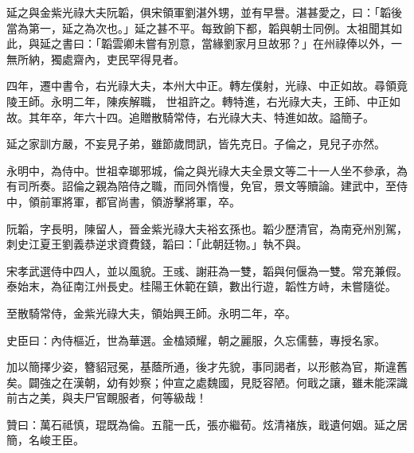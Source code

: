\begin{pinyinscope}
 延之與金紫光祿大夫阮韜，俱宋領軍劉湛外甥，並有早譽。湛甚愛之，曰：「韜後當為第一，延之為次也。」延之甚不平。每致餉下都，韜與朝士同例。太祖聞其如此，與延之書曰：「韜雲卿未嘗有別意，當緣劉家月旦故邪？」在州祿俸以外，一無所納，獨處齋內，吏民罕得見者。



 四年，遷中書令，右光祿大夫，本州大中正。轉左僕射，光祿、中正如故。尋領竟陵王師。永明二年，陳疾解職，
 世祖許之。轉特進，右光祿大夫，王師、中正如故。其年卒，年六十四。追贈散騎常侍，右光祿大夫、特進如故。謚簡子。



 延之家訓方嚴，不妄見子弟，雖節歲問訊，皆先克日。子倫之，見兒子亦然。



 永明中，為侍中。世祖幸瑯邪城，倫之與光祿大夫全景文等二十一人坐不參承，為有司所奏。詔倫之親為陪侍之職，而同外惰慢，免官，景文等贖論。建武中，至侍中，領前軍將軍，都官尚書，領游擊將軍，卒。



 阮韜，字長明，陳留人，晉金紫光祿大夫裕玄孫也。韜少歷清官，為南兗州別駕，刺史江夏王劉義恭逆求資費錢，韜曰：「此朝廷物。」執不與。



 宋孝武選侍中四人，並以風貌。王彧、謝莊為一雙，韜與何偃為一雙。常充兼假。泰始末，為征南江州長史。桂陽王休範在鎮，數出行遊，韜性方峙，未嘗隨從。



 至散騎常侍，金紫光祿大夫，領始興王師。永明二年，卒。



 史臣曰：內侍樞近，世為華選。金榼熲耀，朝之麗服，久忘儒藝，專授名家。



 加以簡擇少姿，簪貂冠冕，基蔭所通，後才先貌，事同謁者，以形骸為官，斯違舊矣。闢強之在漢朝，幼有妙察；仲宣之處魏國，見貶容陋。何戢之讓，雖未能深識前古之美，與夫尸官靦服者，何等級哉！



 贊曰：萬石祗慎，琨既為倫。五龍一氏，張亦繼荀。炫清褚族，戢遺何姻。延之居簡，名峻王臣。



\end{pinyinscope}